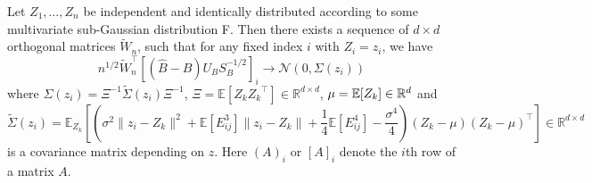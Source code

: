 \begin{lemma}
\label{appthm3}
  Let $Z_1, \dots, Z_n$ be independent and identically distributed according to some multivariate sub-Gaussian distribution F. Then there exists a sequence of $d \times d$ orthogonal matrices $\tilde{W}_n$, such that for any fixed index $i$ with $Z_i = z_i$, we have
  $$ n^{1/2} \tilde{W}_n^{\top} [(\hat{B} - B) U_B S_B^{-1/2}]_{i} \longrightarrow \mathcal{N}(0, \Sigma(z_i))$$
  where $\Sigma (z_i) = {\Xi}^{-1} \widetilde{\Sigma}(z_i) {\Xi}^{-1}$, 
  $\Xi = \mathbb{E}[Z_k{Z_k}^\top] \in \mathbb{R}^{d \times d}$, ${\mu} = \mathbb{E}[Z_k] \in {\mathbb R}^d$ and 
  $$\widetilde{\Sigma} (z_i) = \mathbb{E}_{Z_k}[(\sigma^2 \|z_i - Z_k\|^2 + \mathbb{E}[E_{ij}^3] \|z_i - Z_k \|+ \frac{1}{4} \mathbb{E}[E_{ij}^4] - \frac{\sigma^4}{4}) (Z_k- {\mu}) (Z_k - {\mu})^\top] \in \mathbb{R}^{d \times d}$$  is a covariance matrix depending on $z$. Here $(A)_i$ or $[A]_i$ denote the $i$th row of a matrix $A$. 
\end{lemma}
